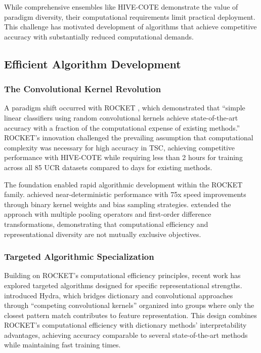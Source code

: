 \documentclass[pdflatex,sn-basic]{sn-jnl}           %
\theoremstyle{thmstyleone}%
\theoremstyle{thmstyletwo}%
\theoremstyle{thmstylethree}%
\begin{document}
While comprehensive ensembles like HIVE-COTE demonstrate the value of paradigm diversity, their computational requirements limit practical deployment. This challenge has motivated development of algorithms that achieve competitive accuracy with substantially reduced computational demands.

\subsection{Efficient Algorithm Development}

\subsubsection{The Convolutional Kernel Revolution}

A paradigm shift occurred with ROCKET \citep[p.~1455]{rocket}, which demonstrated that ``simple linear classifiers using random convolutional kernels achieve state-of-the-art accuracy with a fraction of the computational expense of existing methods.'' ROCKET's innovation challenged the prevailing assumption that computational complexity was necessary for high accuracy in TSC, achieving competitive performance with HIVE-COTE while requiring less than 2 hours for training across all 85 UCR datasets compared to days for existing methods.

The foundation enabled rapid algorithmic development within the ROCKET family. \citet{minirocket} achieved near-deterministic performance with 75x speed improvements through binary kernel weights and bias sampling strategies. \citet{multirocket} extended the approach with multiple pooling operators and first-order difference transformations, demonstrating that computational efficiency and representational diversity are not mutually exclusive objectives.

\subsubsection{Targeted Algorithmic Specialization}

Building on ROCKET's computational efficiency principles, recent work has explored targeted algorithms designed for specific representational strengths. \citet[p.~1780]{hydra} introduced Hydra, which bridges dictionary and convolutional approaches through ``competing convolutional kernels'' organized into groups where only the closest pattern match contributes to feature representation. This design combines ROCKET's computational efficiency with dictionary methods' interpretability advantages, achieving accuracy comparable to several state-of-the-art methods while maintaining fast training times.
\end{document}
